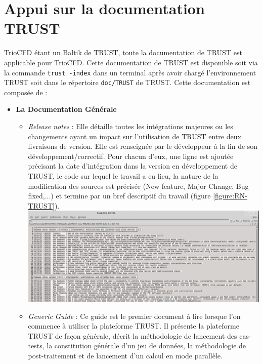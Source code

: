 

\chapter{Appui sur la documentation TRUST}
TrioCFD étant un Baltik de TRUST, toute la documentation de TRUST est applicable pour TrioCFD. Cette documentation de TRUST est disponible soit via la commande \texttt{trust -index} dans un terminal après avoir chargé l'environnement TRUST soit dans le répertoire \texttt{doc/TRUST} de TRUST. Cette documentation est composée de : \\
\begin{itemize}[label=$\Rightarrow$, font=\LARGE]
  \item \textbf{ La Documentation Générale}
  \begin{itemize}
    \item \textit{Release notes} : Elle détaille toutes les intégrations majeures ou les changements ayant un impact sur l'utilisation de TRUST entre deux livraisons de version. Elle est renseignée par le développeur à la fin de son développement/correctif. Pour chacun d'eux, une ligne est ajoutée précisant la date d'intégration dans la version en développement de TRUST, le code sur lequel le travail a eu lieu, la nature de la modification des sources est précisée (New feature, Major Change, Bug fixed,...) et termine par un bref descriptif du travail (figure \ref{figure:RN-TRUST}).\newline
    \includegraphics[width=14.5cm]{pictures/RN-TRUST.png}\vspace*{0.1cm}
  \end{itemize}
  \begin{itemize}  
    \item \textit{Generic Guide} : Ce guide est le premier document à lire lorsque l'on commence à utiliser la plateforme TRUST. Il présente la plateforme TRUST de façon générale, décrit la méthodologie de lancement des cas-tests, la constitution générale d'un jeu de données, la méthodologie de post-traitement et de lancement d'un calcul en mode parallèle. 

\end{itemize}
\end{itemize}
